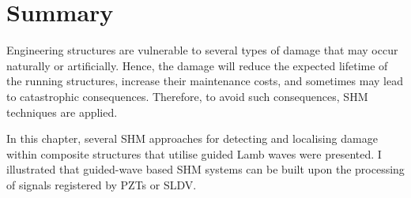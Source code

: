 \section{Summary}
\label{sec24}
Engineering structures are vulnerable to several types of damage that may occur naturally or artificially.
Hence, the damage will reduce the expected lifetime of the running structures, increase their maintenance costs, and sometimes may lead to catastrophic consequences. 
Therefore, to avoid such consequences, SHM techniques are applied.

In this chapter,  several SHM approaches for detecting and localising damage within composite structures that utilise guided Lamb waves were presented. 
I illustrated that guided-wave based SHM systems can be built upon the processing of signals registered by PZTs or SLDV. 
